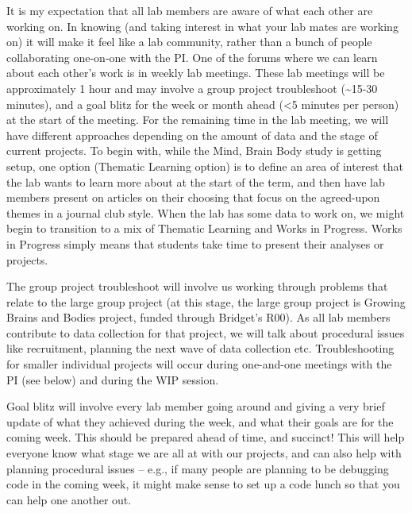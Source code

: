\documentclass[]{book}
\begin{document}
It is my expectation that all lab members are aware of what each other are working on. In knowing (and taking interest in what your lab mates are working on) it will make it feel like a lab community, rather than a bunch of people collaborating one-on-one with the PI. One of the forums where we can learn about each other's work is in weekly lab meetings. These lab meetings will be approximately 1 hour and may involve a group project troubleshoot (\textasciitilde{}15-30 minutes), and a goal blitz for the week or month ahead (\textless{}5 minutes per person) at the start of the meeting. For the remaining time in the lab meeting, we will have different approaches depending on the amount of data and the stage of current projects. To begin with, while the Mind, Brain Body study is getting setup, one option (Thematic Learning option) is to define an area of interest that the lab wants to learn more about at the start of the term, and then have lab members present on articles on their choosing that focus on the agreed-upon themes in a journal club style. When the lab has some data to work on, we might begin to transition to a mix of Thematic Learning and Works in Progress. Works in Progress simply means that students take time to present their analyses or projects.

The group project troubleshoot will involve us working through problems that relate to the large group project (at this stage, the large group project is Growing Brains and Bodies project, funded through Bridget's R00). As all lab members contribute to data collection for that project, we will talk about procedural issues like recruitment, planning the next wave of data collection etc. Troubleshooting for smaller individual projects will occur during one-and-one meetings with the PI (see below) and during the WIP session.

Goal blitz will involve every lab member going around and giving a very brief update of what they achieved during the week, and what their goals are for the coming week. This should be prepared ahead of time, and succinct! This will help everyone know what stage we are all at with our projects, and can also help with planning procedural issues -- e.g., if many people are planning to be debugging code in the coming week, it might make sense to set up a code lunch so that you can help one another out.
\end{document}
